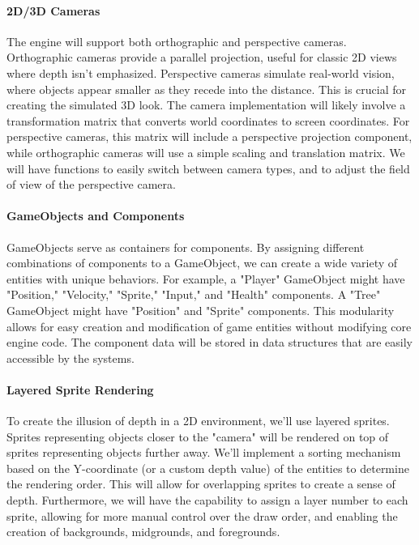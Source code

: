 \documentclass{article}
\begin{document}
\paragraph{2D/3D Cameras}
The engine will support both orthographic and perspective cameras. Orthographic cameras provide a parallel projection, useful for classic 2D views where depth isn't emphasized. Perspective cameras simulate real-world vision, where objects appear smaller as they recede into the distance. This is crucial for creating the simulated 3D look. The camera implementation will likely involve a transformation matrix that converts world coordinates to screen coordinates. For perspective cameras, this matrix will include a perspective projection component, while orthographic cameras will use a simple scaling and translation matrix. We will have functions to easily switch between camera types, and to adjust the field of view of the perspective camera.

\paragraph{GameObjects and Components}
GameObjects serve as containers for components. By assigning different combinations of components to a GameObject, we can create a wide variety of entities with unique behaviors. For example, a "Player" GameObject might have "Position," "Velocity," "Sprite," "Input," and "Health" components. A "Tree" GameObject might have "Position" and "Sprite" components. This modularity allows for easy creation and modification of game entities without modifying core engine code. The component data will be stored in data structures that are easily accessible by the systems.

\paragraph{Layered Sprite Rendering}
To create the illusion of depth in a 2D environment, we'll use layered sprites. Sprites representing objects closer to the "camera" will be rendered on top of sprites representing objects further away. We'll implement a sorting mechanism based on the Y-coordinate (or a custom depth value) of the entities to determine the rendering order. This will allow for overlapping sprites to create a sense of depth. Furthermore, we will have the capability to assign a layer number to each sprite, allowing for more manual control over the draw order, and enabling the creation of backgrounds, midgrounds, and foregrounds.
\end{document}
